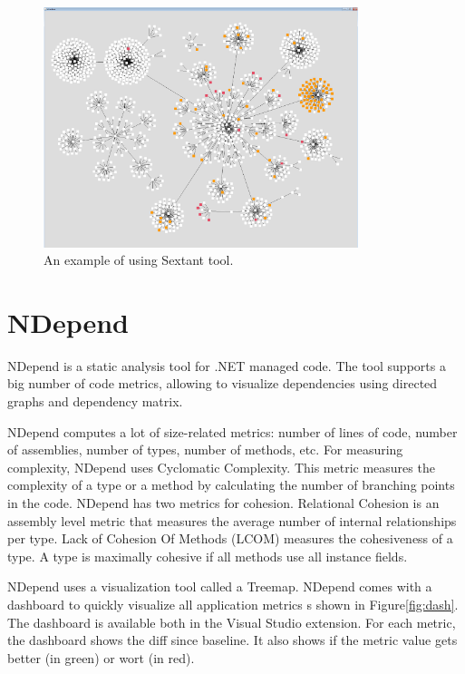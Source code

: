\begin{figure}[h]
	\centering
	\includegraphics[height=70mm]{figures/1.png}
	\caption{An example of using Sextant tool.}
	\label{fig:1}
\end{figure}

\section{NDepend}

NDepend is a static analysis tool for .NET managed code. The tool supports a big number of code metrics, allowing to visualize dependencies using directed graphs and dependency matrix.  

NDepend computes a lot of size-related metrics: number of lines of code, number of assemblies, number of types, number of methods, etc. For measuring complexity, NDepend uses Cyclomatic Complexity. This metric measures the complexity of a type or a method by calculating the number of branching points in the code.
NDepend has two metrics for cohesion. Relational Cohesion is an assembly level metric that measures the average number of internal relationships per type. Lack of Cohesion Of Methods (LCOM) measures the cohesiveness of a type. A type is maximally cohesive if all methods use all instance fields.

NDepend uses a visualization tool called a Treemap.
NDepend comes with a dashboard to quickly visualize all application metrics s shown in Figure\ref{fig:dash}. The dashboard is available both in the Visual Studio extension. For each metric, the dashboard shows the diff since baseline. It also shows if the metric value gets better (in green) or wort (in red). 


